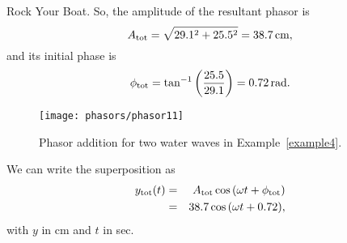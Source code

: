 \begin{example}{Rock Your Boat.}
\noindent So, the amplitude of the resultant phasor is 
\begin{equation}
A_{\rm tot} = \sqrt{29.1^2 + 25.5^2} =38.7\,\mbox{cm}, 
\end{equation} 
and its initial phase is 
\begin{equation}
\phi_{\rm tot} = \tan^{-1}{\left(\frac{25.5}{29.1}\right)} 
                  = 0.72\,\mbox{rad}.  
\end{equation} 

\begin{figure}[b]
\begin{center}
 \texttt{[image: phasors/phasor11]} 
\caption{\label{fig:phasor11}Phasor addition  for 
two water waves in Example~\ref{example4}.}
\end{center}
\end{figure}
We can write the superposition as
\begin{eqnarray*}
 y_{\rm tot}(t) & = & A_{\rm tot}\cos{(\omega t + \phi_{\rm tot})} \\
            & = & 38.7\cos{(\omega t + 0.72)}, \\
\end{eqnarray*}
with $y$ in cm and $t$ in sec.
\end{example}
\newpage

